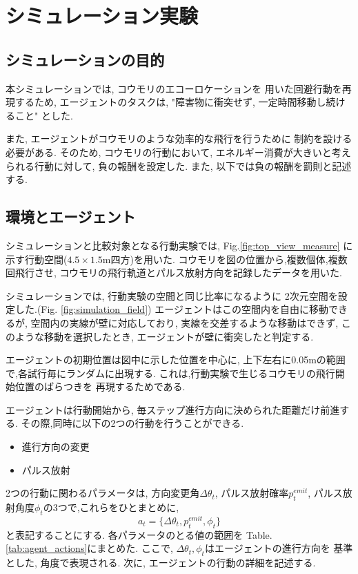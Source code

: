 \documentclass[../main]{subfiles}
\begin{document}
\newpage
\chapter{シミュレーション実験}
\label{chap:simulation}

\section{シミュレーションの目的}
本シミュレーションでは, コウモリのエコーロケーションを
用いた回避行動を再現するため, エージェントのタスクは, 
"障害物に衝突せず, 一定時間移動し続けること" とした.

また, エージェントがコウモリのような効率的な飛行を行うために
制約を設ける必要がある.
そのため, コウモリの行動において, 
エネルギー消費が大きいと考えられる行動に対して, 
負の報酬を設定した.
また, 以下では負の報酬を罰則と記述する.

\section{環境とエージェント}
シミュレーションと比較対象となる行動実験では,
Fig.\ref{fig:top_view_measure}
に示す行動空間($4.5 \times 1.5$\si{m}四方)を用いた.
コウモリを図の位置から,複数個体,複数回飛行させ,
コウモリの飛行軌道とパルス放射方向を記録したデータを用いた.

シミュレーションでは, 行動実験の空間と同じ比率になるように
2次元空間を設定した.(Fig. \ref{fig:simulation_field})
エージェントはこの空間内を自由に移動できるが,
空間内の実線が壁に対応しており,
実線を交差するような移動はできず, 
このような移動を選択したとき, 
エージェントが壁に衝突したと判定する.

エージェントの初期位置は図中に示した位置を中心に,
上下左右に0.05\si{m}の範囲で,各試行毎にランダムに出現する.
これは,行動実験で生じるコウモリの飛行開始位置のばらつきを
再現するためである.

エージェントは行動開始から, 
毎ステップ進行方向に決められた距離だけ前進する.
その際,同時に以下の2つの行動を行うことができる.
\begin{itemize}
    \item 進行方向の変更
    \item パルス放射
\end{itemize}
2つの行動に関わるパラメータは,
方向変更角$\Delta\theta_t$,
パルス放射確率$p^{emit}_t$,
パルス放射角度$\phi_t$の3つで,これらをひとまとめに,
$$a_t=\{\Delta\theta_t, p^{emit}_t, \phi_t \}$$
と表記することにする.
各パラメータのとる値の範囲を
Table.\ref{tab:agent_actions}にまとめた.
ここで, $\Delta\theta_t, \phi_t$はエージェントの進行方向を
基準とした, 角度で表現される.
次に, エージェントの行動の詳細を記述する.
\end{document}
